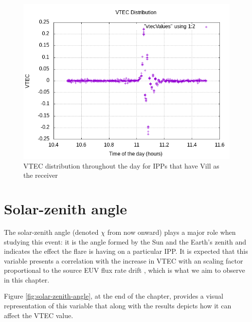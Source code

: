 \begin{figure}[!htb]
	\begin{centering}
		\includegraphics[width=0.5\linewidth]{images/ch4/vtecDistributionVill.png}
		\caption{VTEC distribution throughout the day for IPPs that have Vill as the receiver}
		\label{fig:vtecDistribution}
	\end{centering}
\end{figure}


\clearpage

\section{Solar-zenith angle}

The solar-zenith angle (denoted $\chi$ from now onward) plays a major role when studying this event: it is the angle formed by the Sun and the Earth's zenith and indicates the effect the flare is having on a particular IPP. It is expected that this variable presents a correlation with the increase in VTEC with an scaling factor proportional to the source EUV flux rate drift \cite{hernandez2012gnss}, which is what we aim to observe in this chapter.

Figure \ref{fig:solar-zenith-angle}, at the end of the chapter, provides a visual representation of this variable that along with the results depicts how it can affect the VTEC value. 

